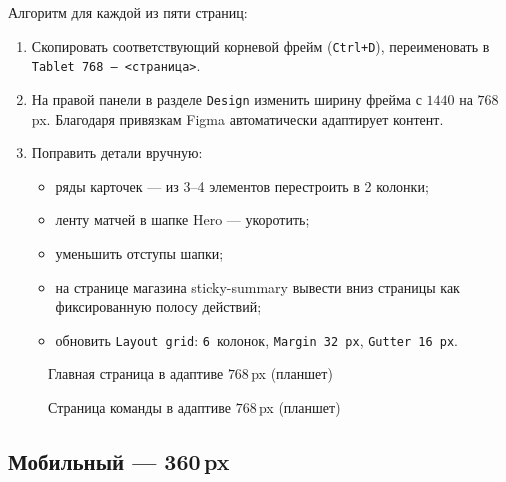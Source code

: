 Алгоритм для каждой из пяти страниц:
\begin{enumerate}
  \item Скопировать соответствующий корневой фрейм (\texttt{Ctrl+D}),
        переименовать в \texttt{Tablet~768~--~<страница>}.
  \item На правой панели в разделе \texttt{Design} изменить ширину
        фрейма с \(1440\) на \(768\,\)px. Благодаря привязкам
        Figma автоматически адаптирует контент.
  \item Поправить детали вручную:
  \begin{itemize}
    \item ряды карточек --- из 3--4 элементов перестроить в 2 колонки;
    \item ленту матчей в шапке Hero --- укоротить;
    \item уменьшить отступы шапки;
    \item на странице магазина sticky-summary вывести вниз страницы
          как фиксированную полосу действий;
    \item обновить \texttt{Layout grid}: \texttt{6}~колонок,
          \texttt{Margin~32\,px}, \texttt{Gutter~16\,px}.
  \end{itemize}
\end{enumerate}

\begin{figure}[h]
  \centering
  \caption{Главная страница в адаптиве \(768\,\)px (планшет)}
  \label{fig:tablet_home}
\end{figure}

\begin{figure}[h]
  \centering
  \caption{Страница команды в адаптиве \(768\,\)px (планшет)}
  \label{fig:tablet_team}
\end{figure}

\subsection{Мобильный --- 360\,px}

